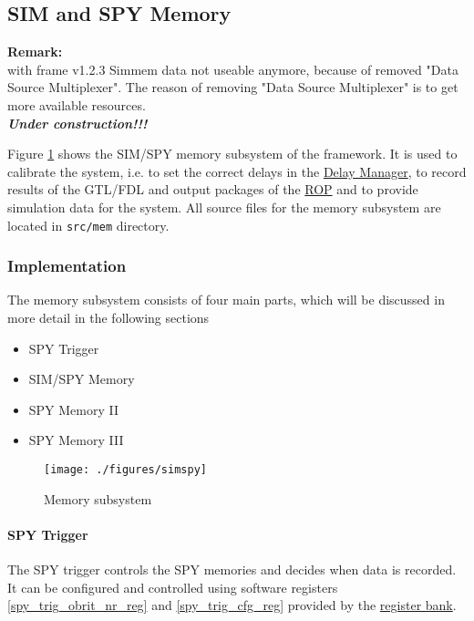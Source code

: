 \subsection{SIM and SPY Memory}\label{sec:sim-spy}
\textbf{Remark:}\\
with frame v1.2.3 Simmem data not useable anymore, because of removed "Data Source Multiplexer".
The reason of removing "Data Source Multiplexer" is to get more available resources.\\

\textbf{\textit{Under construction!!!}}

Figure \ref{fig_simspy} shows the SIM/SPY memory subsystem of the framework.
It is used to calibrate the system, i.e. to set the correct delays in the \hyperref[sec_dm]{Delay Manager}, to record results of the GTL/FDL and
output packages of the \hyperref[sec_rop]{ROP} and to provide simulation data for the system.
All source files for the memory subsystem are located in \texttt{src/mem} directory.

\subsubsection{Implementation}\label{sec:sim_spy_impl}
The memory subsystem consists of four main parts, which will be discussed in more detail in the following sections

\begin{itemize}
\item SPY Trigger
\item SIM/SPY Memory
\item SPY Memory II
\item SPY Memory III
\end{itemize}

\begin{figure}[h]
\texttt{[image: ./figures/simspy]}
\caption{Memory subsystem}
\label{fig_simspy}
\end{figure}

\paragraph{SPY Trigger}\label{sec:spy_trigger}
The SPY trigger controls the SPY memories and decides when data is recorded. It can be configured and controlled using
software registers \ref{spy_trig_obrit_nr_reg} and \ref{spy_trig_cfg_reg} provided by the \hyperref[sec_rb]{register bank}.

